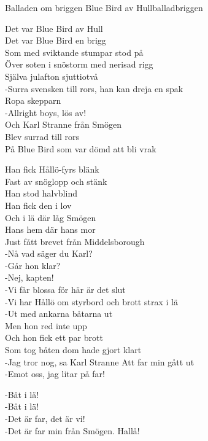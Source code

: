 \begin{song}{Balladen om briggen Blue Bird av Hull}{balladbriggen}
\begin{vers}
Det var Blue Bird av Hull\\
Det var Blue Bird en brigg\\
Som med sviktande stumpar stod på\\
Över soten i snöstorm med nerisad rigg\\
Själva julafton sjuttiotvå\\
-Surra svensken till rors, han kan dreja en spak\\
Ropa skepparn\\
-Allright boys, lös av!\\
Och Karl Stranne från Smögen\\
Blev surrad till rors\\
På Blue Bird som var dömd att bli vrak\\
\end{vers}
\begin{vers}
Han fick Hållö-fyrs blänk\\
Fast av snöglopp och stänk\\
Han stod halvblind\\
Han fick den i lov\\
Och i lä där låg Smögen\\
Hans hem där hans mor\\
Just fått brevet från Middelsborough\\
-Nå vad säger du Karl?\\
-Går hon klar?\\
-Nej, kapten!\\
-Vi får blossa för här är det slut\\
-Vi har Hållö om styrbord och brott strax i lä\\
-Ut med ankarna båtarna ut\\
Men hon red inte upp\\
Och hon fick ett par brott\\
Som tog båten dom hade gjort klart\\
-Jag tror nog, sa Karl Stranne Att far min gått ut\\
-Emot oss, jag litar på far!\\
\end{vers}
\begin{vers}
-Båt i lä!\\
-Båt i lä!\\
-Det är far, det är vi!\\
-Det är far min från Smögen. Hallå!\\

\end{vers}
\end{song}
